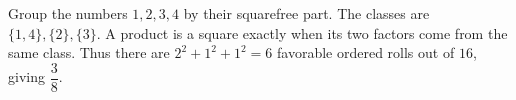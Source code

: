 Group the numbers $1,2,3,4$ by their squarefree part. The classes are $\{1,4\},\{2\},\{3\}$. A product is a square exactly when its two factors come from the same class. Thus there are $2^2+1^2+1^2=6$ favorable ordered rolls out of $16$, giving $\boxed{\dfrac{3}{8}}$.
